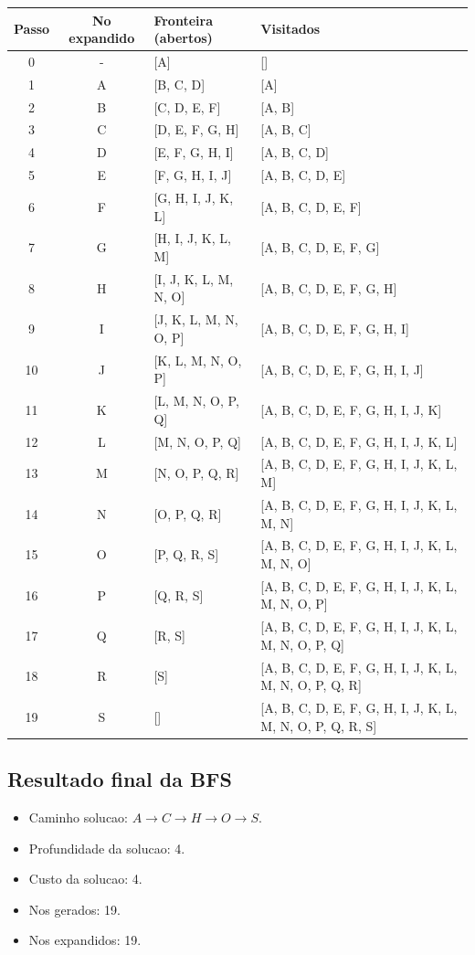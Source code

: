 \begingroup
\footnotesize
\setlength{\tabcolsep}{4pt}
\renewcommand{\arraystretch}{1.15}
\begin{longtable}{c c p{4.9cm} p{5.9cm}}
\toprule
Passo & No expandido & Fronteira (abertos) & Visitados \\
\midrule
0 & - & [A] & [] \\
1 & A & [B, C, D] & [A] \\
2 & B & [C, D, E, F] & [A, B] \\
3 & C & [D, E, F, G, H] & [A, B, C] \\
4 & D & [E, F, G, H, I] & [A, B, C, D] \\
5 & E & [F, G, H, I, J] & [A, B, C, D, E] \\
6 & F & [G, H, I, J, K, L] & [A, B, C, D, E, F] \\
7 & G & [H, I, J, K, L, M] & [A, B, C, D, E, F, G] \\
8 & H & [I, J, K, L, M, N, O] & [A, B, C, D, E, F, G, H] \\
9 & I & [J, K, L, M, N, O, P] & [A, B, C, D, E, F, G, H, I] \\
10 & J & [K, L, M, N, O, P] & [A, B, C, D, E, F, G, H, I, J] \\
11 & K & [L, M, N, O, P, Q] & [A, B, C, D, E, F, G, H, I, J, K] \\
12 & L & [M, N, O, P, Q] & [A, B, C, D, E, F, G, H, I, J, K, L] \\
13 & M & [N, O, P, Q, R] & [A, B, C, D, E, F, G, H, I, J, K, L, M] \\
14 & N & [O, P, Q, R] & [A, B, C, D, E, F, G, H, I, J, K, L, M, N] \\
15 & O & [P, Q, R, S] & [A, B, C, D, E, F, G, H, I, J, K, L, M, N, O] \\
16 & P & [Q, R, S] & [A, B, C, D, E, F, G, H, I, J, K, L, M, N, O, P] \\
17 & Q & [R, S] & [A, B, C, D, E, F, G, H, I, J, K, L, M, N, O, P, Q] \\
18 & R & [S] & [A, B, C, D, E, F, G, H, I, J, K, L, M, N, O, P, Q, R] \\
19 & S & [] & [A, B, C, D, E, F, G, H, I, J, K, L, M, N, O, P, Q, R, S] \\
\bottomrule
\end{longtable}
\endgroup

\subsection{Resultado final da BFS}
\begin{itemize}[leftmargin=1.5em]
  \item Caminho solucao: $A \rightarrow C \rightarrow H \rightarrow O \rightarrow S$.
  \item Profundidade da solucao: 4.
  \item Custo da solucao: 4.
  \item Nos gerados: 19.
  \item Nos expandidos: 19.
\end{itemize}

